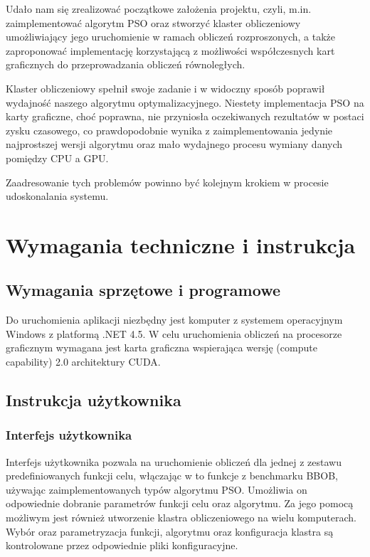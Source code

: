 \documentclass[12pt, twoside, openany, abstract=on]{report}
\theoremstyle{definition}
\begin{document}
Udało nam się zrealizować początkowe założenia projektu, czyli, m.in. zaimplementować algorytm PSO oraz stworzyć klaster obliczeniowy umożliwiający jego uruchomienie w ramach obliczeń rozproszonych, a także zaproponować implementację korzystającą z możliwości współczesnych kart graficznych do przeprowadzania obliczeń równoległych.

Klaster obliczeniowy spełnił swoje zadanie i w widoczny sposób poprawił wydajność naszego algorytmu optymalizacyjnego. Niestety implementacja PSO na karty graficzne, choć poprawna, nie przyniosła oczekiwanych rezultatów w postaci zysku czasowego, co prawdopodobnie wynika z zaimplementowania jedynie najprostszej wersji algorytmu oraz mało wydajnego procesu wymiany danych pomiędzy CPU a GPU. 

Zaadresowanie tych problemów powinno być kolejnym krokiem w procesie udoskonalania systemu. 


\chapter{Wymagania techniczne i instrukcja}

\section{Wymagania sprzętowe i programowe}

Do uruchomienia aplikacji niezbędny jest komputer z systemem operacyjnym Windows z
platformą .NET 4.5. W celu uruchomienia obliczeń na procesorze graficznym wymagana jest karta graficzna wspierająca wersję (compute capability) 2.0 architektury CUDA.

\section{Instrukcja użytkownika}

\subsection{Interfejs użytkownika}
Interfejs użytkownika pozwala na uruchomienie obliczeń dla jednej z zestawu predefiniowanych funkcji celu, włączając w to funkcje z benchmarku BBOB, używając zaimplementowanych typów algorytmu PSO. Umożliwia on odpowiednie dobranie parametrów funkcji celu oraz algorytmu. Za jego pomocą możliwym jest również utworzenie klastra obliczeniowego na wielu komputerach. Wybór oraz parametryzacja funkcji, algorytmu oraz konfiguracja klastra są kontrolowane przez odpowiednie pliki konfiguracyjne. 
\end{document}
